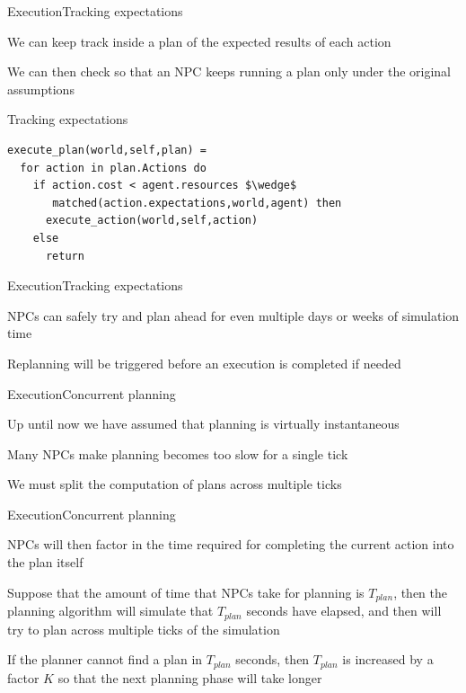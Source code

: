 \documentclass{beamer}
\begin{document}
\begin{slide}{Execution}{Tracking expectations}{
\item We can keep track inside a plan of the expected results of each action
\item We can then check so that an NPC keeps running a plan only under the original assumptions
}\end{slide}

\begin{frame}[fragile]{Tracking expectations}
\begin{lstlisting}
execute_plan(world,self,plan) =
  for action in plan.Actions do
    if action.cost < agent.resources $\wedge$
       matched(action.expectations,world,agent) then
      execute_action(world,self,action)
    else
      return
\end{lstlisting}
\end{frame}

\begin{slide}{Execution}{Tracking expectations}{
\item NPCs can safely try and plan ahead for even multiple days or weeks of simulation time
\item Replanning will be triggered before an execution is completed if needed
}\end{slide}

\begin{slide}{Execution}{Concurrent planning}{
\item Up until now we have assumed that planning is virtually instantaneous
\item Many NPCs make planning becomes too slow for a single tick
\item We must split the computation of plans across multiple ticks
}\end{slide}

\begin{slide}{Execution}{Concurrent planning}{
\item NPCs will then factor in the time required for completing the current action into the plan itself
\item Suppose that the amount of time that NPCs take for planning is $T_{plan}$, then the planning algorithm will simulate that $T_{plan}$ seconds have elapsed, and then will try to plan across multiple ticks of the simulation
\item If the planner cannot find a plan in $T_{plan}$ seconds, then $T_{plan}$ is increased by a factor $K$ so that the next planning phase will take longer
}\end{slide}
\end{document}
